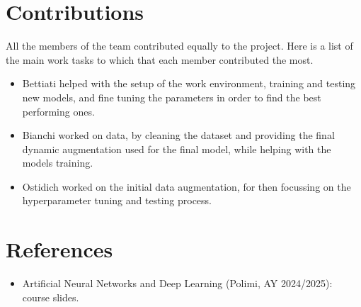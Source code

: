 \documentclass[11pt]{article}
\begin{document}
\section{Contributions}

All the members of the team contributed equally to the project. 
Here is a list of the main work tasks to which that each member contributed the most.

\begin{itemize}
    \item Bettiati helped with the setup of the work environment, training and testing new models, and fine tuning the parameters in order to find the best performing ones.
    \item Bianchi worked on data, by cleaning the dataset and providing the final dynamic augmentation used for the final model, while helping with the models training.
    \item Ostidich worked on the initial data augmentation, for then focussing on the hyperparameter tuning and testing process.
\end{itemize}

\section{References}

\begin{itemize}
    \item Artificial Neural Networks and Deep Learning (Polimi, AY 2024/2025): course slides.
\end{itemize}
\end{document}
